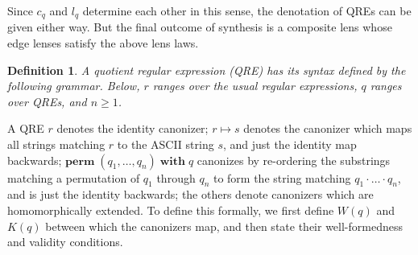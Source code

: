 \documentclass[a4paper,11pt] {article}
\theoremstyle{plain}
\newtheorem{definition}[theorem]{Definition}
\newcommand{\lcanonize}[1]{\textit{$#1$.canonize}}
\newcommand{\lchoose}[1]{\textit{$#1$.choose}}
\newcommand{\perm}{ \textbf{perm}\; }
\newcommand{\with}{ \;\textbf{with}\; }
\begin{document}
Since $c_q$ and $l_q$ determine each other in this sense, the denotation of
QREs can be given either way. But the final outcome of synthesis is a
composite lens whose edge lenses satisfy the above lens laws.

\begin{comment}
The equivalence relation can be given by a canonizer $c_q$ consisting of two functions
\begin{itemize}
\item $\lcanonize{c}: W(q) \to K(q)$ and
\item $\lchoose{c}: K(q) \to W(q)$
\end{itemize}
such that for every $s \in K(q)$,
\begin{align*}
  \lcanonize{c} \; (\lchoose{c} \; s) = s
\end{align*}
\end{comment}

\begin{definition}
A quotient regular expression (QRE) has its syntax defined by
the following grammar. Below, $r$ ranges over the usual regular expressions,
$q$ ranges over QREs, and $n \geq 1$.
\begin{center}
\ottgrammartabular{\ottr\ottinterrule}
\end{center}

\begin{center}
\ottgrammartabular{\ottq\ottinterrule}
\end{center}
\end{definition}


A QRE $r$ denotes the identity canonizer; $r \mapsto s$ denotes the
canonizer which maps all strings matching $r$ to the ASCII string $s$,
and just the identity map backwards; $\perm(q_1, \ldots, q_n) \with q$
canonizes by re-ordering the substrings matching a permutation of
$q_1$ through $q_n$ to form the string matching
$q_1 \cdot \ldots \cdot q_n$, and is just the identity backwards;
the others denote canonizers which are homomorphically extended.
To define this formally, we first define $W(q)$ and $K(q)$ between
which the canonizers map, and then state their well-formedness and
validity conditions. 
\end{document}
